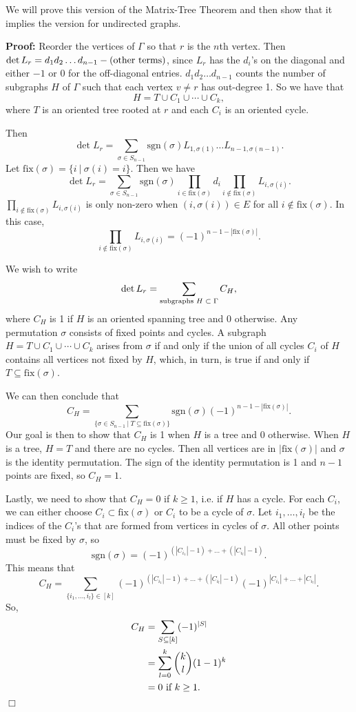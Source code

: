 \documentclass[11pt]{article}
\newenvironment{proof}{\noindent \textbf{Proof:}}{$\Box$}
\begin{document}
We will prove this version of the Matrix-Tree Theorem and then show that it implies the version for undirected graphs.

\begin{proof}
Reorder the vertices of $\Gamma$ so that $r$ is the $n$th vertex. 
Then $\det{L_r} = d_1 d_2 \ldots d_{n-1} - (\textup{other terms})$, since $L_r$ has the $d_i$'s on the diagonal and either $-1$ or $0$ for the off-diagonal entries.  $d_1 d_2 \ldots d_{n-1}$ counts the number of subgraphs $H$ of $\Gamma$ such that each vertex $v \neq r$ has out-degree 1.  So we have that
$$H = T \cup C_1 \cup \cdots \cup C_k,$$
where $T$ is an oriented tree rooted at $r$ and each $C_i$ is an oriented cycle.

 Then
$$\det{L_r} = \sum_{\sigma \in S_{n-1}}{\mathrm{sgn}{(\sigma)} L_{1, \sigma(1)} \ldots L_{n-1, \sigma(n-1)}}.$$
Let $\mathrm{fix}{(\sigma)} = \{i~|~\sigma(i) = i\}$.  Then we have
$$\det{L_r} = \sum_{\sigma \in S_{n-1}}{\mathrm{sgn}{(\sigma)} \prod_{i \in \mathrm{fix}{(\sigma)}}{d_i} \prod_{i \notin \mathrm{fix}{(\sigma)}} L_{i, \sigma(i)}}.$$
$\prod_{i \notin \mathrm{fix}{(\sigma)}} L_{i, \sigma(i)}$ is only non-zero when $(i,\sigma(i)) \in E$ for all $i \notin \mathrm{fix}{(\sigma)}$.  In this case,
$$\prod_{i \notin \mathrm{fix}{(\sigma)}} L_{i, \sigma(i)} = (-1)^{n-1-|\mathrm{fix}(\sigma)|} .$$

We wish to write
$$ \det{L_r} = \sum_{\textup{subgraphs $H \subset \Gamma$}}{C_H},$$
where $C_H$ is 1 if $H$ is an oriented spanning tree and 0 otherwise.  Any permutation $\sigma$ consists of fixed points and cycles.  A subgraph $H = T \cup C_1 \cup \cdots \cup C_k$ arises from $\sigma$ if and only if the union of all cycles $C_i$ of $H$ contains all vertices not fixed by $H$, which, in turn, is true if and only if $T \subseteq \mathrm{fix}(\sigma)$.

We can then conclude that
$$C_H = \sum_{\{\sigma \in S_{n-1}~|~T \subseteq \mathrm{fix}(\sigma)\}} \mathrm{sgn}(\sigma) (-1)^{n-1-|\mathrm{fix}(\sigma)|}.$$
Our goal is then to show that $C_H$ is 1 when $H$ is a tree and 0 otherwise.  When $H$ is a tree, $H = T$ and there are no cycles.  Then all vertices are in $|\mathrm{fix}(\sigma)|$ and $\sigma$ is the identity permutation.  The sign of the identity permutation is 1 and $n-1$ points are fixed, so $C_H = 1$.

Lastly, we need to show that $C_H = 0$ if $k \geq 1$, i.e. if $H$ has a cycle.  For each $C_i$, we can either choose $C_i \subset \mathrm{fix}(\sigma)$ or $C_i$ to be a cycle of $\sigma$.  Let $i_1, \ldots, i_l$ be the indices of the $C_i$'s that are formed from vertices in cycles of $\sigma$.  All other points must be fixed by $\sigma$, so
$$\mathrm{sgn}(\sigma) = (-1)^{(|C_{i_1}|-1) + \ldots + (|C_{i_l}|-1)}.$$
This means that
$$C_H = \sum_{\{i_1, \ldots, i_l\} \in [k]} (-1)^{(|C_{i_1}|-1) + \ldots + (|C_{i_l}|-1)} (-1)^{|C_{i_1}|+\ldots+|C_{i_l}|}.$$
So,
$$
\begin{aligned}
C_H &= \sum_{S \subseteq [k]} (-1)^{|S|} \\
&= \sum_{l=0}^k \binom{k}{l} (1-1)^k \\
&= 0~\textup{if $k \geq 1$}.
\end{aligned}
$$
\end{proof}
\end{document}

